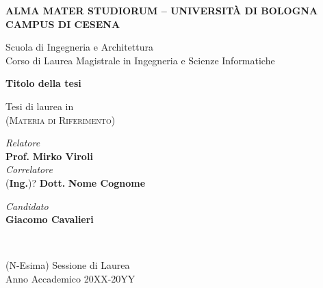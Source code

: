 \begin{titlepage}
	\begin{center}
		\large
		\textbf{ALMA MATER STUDIORUM -- UNIVERSITÀ DI BOLOGNA \\ CAMPUS DI CESENA}
		\\
		\noindent\hrulefill
		\vspace{0.4cm}

		\Large
		Scuola di Ingegneria e Architettura \\
		Corso di Laurea Magistrale in Ingegneria e Scienze Informatiche

		\Huge
		\vspace{4cm}
		\textbf{Titolo della tesi}

		\large
		\vspace{1cm}
		Tesi di laurea in
		\\
		\textsc{(Materia di Riferimento)}

		\vspace{5.5cm}
		\begin{minipage}[t]{0.64\textwidth}
			\begin{flushleft}
				\textit{Relatore}
				\\
				\textbf{Prof.} \textbf{Mirko Viroli}
				\\
				\vspace{0.4cm}
				\textit{Correlatore}
				\\
				(\textbf{Ing.})? \textbf{Dott.} \textbf{Nome Cognome}
			\end{flushleft}
		\end{minipage}
		\begin{minipage}[t]{0.34\textwidth}
			\begin{flushright}
				\textit{Candidato}
				\\
				\textbf{Giacomo Cavalieri}
			\end{flushright}
		\end{minipage}\\

		\vfill
		\noindent\hrulefill
		\vspace{0.3cm}
		\Large

		(N-Esima) Sessione di Laurea
		\\
		Anno Accademico 20XX-20YY
	\end{center}
\end{titlepage}
\restoregeometry